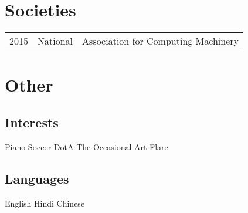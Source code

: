 \documentclass[]{deedy-resume-openfont}
\begin{document}
\begin{minipage}[t]{0.66\textwidth}
\section{Societies} 

\begin{tabular}{rll}
2015         & National  & Association for Computing Machinery\\
\end{tabular}

\sectionsep


\section{Other} 
\subsection{Interests}
Piano \textbullet{} Soccer \textbullet{} DotA \textbullet{} The Occasional Art Flare \\
\sectionsep
\subsection{Languages}
English \textbullet{} Hindi \textbullet{} Chinese
\sectionsep

\end{minipage} 
\end{document}
